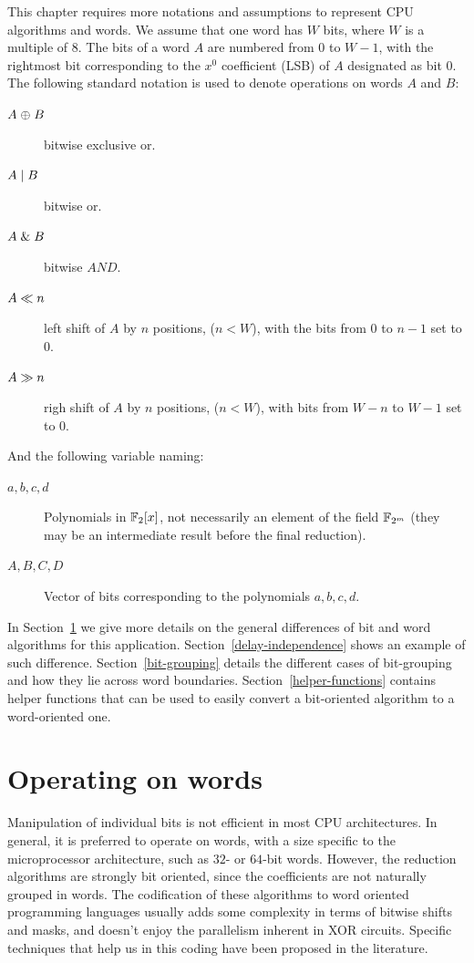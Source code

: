 This chapter requires more notations and assumptions to represent CPU algorithms and words. We assume that one word has $W$ bits, where $W$ is a multiple of $8$. The bits of a word $A$ are numbered from $0$ to $W-1$, with the rightmost bit corresponding to the $x^0$ coefficient (LSB) of $A$ designated as bit $0$. The following standard notation is used to denote operations on words $A$ and $B$:\\

\begin{description}
\item[$A \mathrel{\oplus} B$] bitwise exclusive or.
\item[$A \mathrel{|} B$]  bitwise or. 
\item[$A \mathrel{\&} B$]      bitwise $AND$.
\item[$A \ll n$]      left shift of $A$ by $n$ positions, ($n<W$), with the bits from 0 to $n-1$ set to $0$. 
\item[$A\gg n$]     righ shift of $A$ by $n$ positions, ($n<W$), with bits from $W-n$ to $W-1$ set to $0$. 
\end{description}

And the following variable naming:

\begin{description}
\item[$a, b, c, d$]  Polynomials in $\mathbb{F}_2[x]$, not necessarily an element of the field $\mathbb{F}_{2^m}$ (they may be an intermediate result before the final reduction).
\item[$A, B, C, D$]  Vector of bits corresponding to the polynomials $a, b, c, d$.
\end{description}

In Section~\ref{operating-on-words} we give more details on the general differences of bit and word algorithms for this application. Section~\ref{delay-independence} shows an example of such difference. Section~\ref{bit-grouping} details the different cases of bit-grouping and how they lie across word boundaries. Section~\ref{helper-functions} contains helper functions that can be used to easily convert a bit-oriented algorithm to a word-oriented one.

\section{Operating on words}\label{operating-on-words}

Manipulation of individual bits is not efficient in most CPU architectures. In general, it is preferred to operate on words, with a size specific to the microprocessor architecture, such as $32$- or $64$-bit words. However, the reduction algorithms are strongly bit oriented, since the coefficients are not naturally grouped in words. The codification of these algorithms to word oriented programming languages usually adds some complexity in terms of bitwise shifts and masks, and doesn't enjoy the parallelism inherent in XOR circuits. Specific techniques that help us in this coding have been proposed in the literature\cite{Hilewitz2008}.  \\

